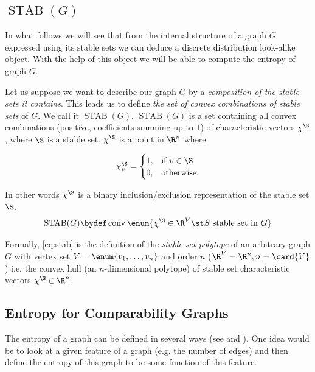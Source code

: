 


\subsection*{$\operatorname{STAB}(G)$}
\label{tree:poset:graph:stab}

In what follows we will see that from the internal structure of a graph $G$
expressed using its stable sets we can deduce a discrete distribution
look-alike object. With the help of this object we will be able to compute the
entropy of graph $G$.

Let us suppose we want to describe our graph $G$ by a \emph{composition of the
stable sets it contains}. This leads us to define \emph{the set of convex
combinations of stable sets} of $G$. We call it $\operatorname{STAB}(G)$.
$\operatorname{STAB}(G)$ is a set containing all convex combinations (positive,
coefficients summing up to $1$) of characteristic vectors $\chi^{\S}$, where $\S$
is a stable set. $\chi^{\S}$ is a point in $\R^n$ where

$$ \chi^{\S}_v =\begin{cases}
      1, & \text{if}\ v \in \S\\
      0, & \text{otherwise}.
    \end{cases}$$


In other words $\chi^{\S}$ is a binary inclusion/exclusion representation of the
stable set $\S$.
\begin{equation}
\operatorname{STAB}(G) \bydef \operatorname{conv}\enum{\chi^{\S} \in \R^V \st
S\text{ stable set in }G}
\label{eq:stab}
\end{equation}

Formally, \ref{eq:stab} is the definition of the \emph{stable set polytope} of
an arbitrary graph $G$ with vertex set $V = \enum{v_1, \ldots, v_n }$
and order $n$ ($\R^V = \R^n, n = \card{V}$) i.e. the convex hull (an $n$-dimensional
polytope) of stable set characteristic vectors $\chi^{\S} \in \R^n$.



\subsection*{Entropy for Comparability Graphs}

The entropy of a graph can be defined in several ways (see
\citet*{mowshowitz2012entropy} and \citet*{simonyi1995graph}). One idea would
be to look at a given feature of a graph (e.g. the number of edges) and then
define the entropy of this graph to be some function of this feature.

